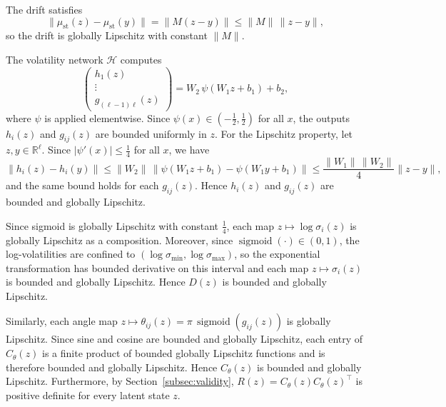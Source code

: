\begin{description}[
    style=unboxed,
    leftmargin=0pt,
    labelindent=0pt,
    labelsep=0.5em
]

\item[Drift.]
The drift satisfies
\[
\|\mu_{\mathrm{st}}(z)-\mu_{\mathrm{st}}(y)\|
=
\|M(z-y)\|
\leq
\|M\|\,\|z-y\|,
\]
so the drift is globally Lipschitz with constant $\|M\|$.

\item[Diffusion.]
The volatility network $\mathcal{H}$ computes
\[
\begin{pmatrix} h_1(z) \\ \vdots \\ g_{(\ell-1)\ell}(z) \end{pmatrix}
=
W_2\,\psi(W_1 z + b_1) + b_2,
\]
where $\psi$ is applied elementwise. Since $\psi(x)\in(-\tfrac{1}{2},\tfrac{1}{2})$
for all $x$, the outputs $h_i(z)$ and $g_{ij}(z)$ are bounded uniformly in $z$.
For the Lipschitz property, let $z,y\in\mathbb{R}^\ell$. Since
$|\psi'(x)|\leq\tfrac{1}{4}$ for all $x$, we have
\[
\|h_i(z)-h_i(y)\|
\leq
\|W_2\|\,\|\psi(W_1 z+b_1)-\psi(W_1 y+b_1)\|
\leq
\frac{\|W_1\|\,\|W_2\|}{4}\|z-y\|,
\]
and the same bound holds for each $g_{ij}(z)$. Hence $h_i(z)$ and $g_{ij}(z)$
are bounded and globally Lipschitz.

Since sigmoid is globally Lipschitz with constant $\tfrac{1}{4}$, each map
$z\mapsto\log\sigma_i(z)$ is globally Lipschitz as a composition. Moreover,
since $\operatorname{sigmoid}(\cdot)\in(0,1)$, the log-volatilities are confined
to $(\log\sigma_{\min},\log\sigma_{\max})$, so the exponential transformation
has bounded derivative on this interval and each map $z\mapsto\sigma_i(z)$ is
bounded and globally Lipschitz. Hence $D(z)$ is bounded and globally Lipschitz.

Similarly, each angle map
$z\mapsto\theta_{ij}(z)=\pi\,\operatorname{sigmoid}(g_{ij}(z))$
is globally Lipschitz. Since sine and cosine are bounded and globally Lipschitz,
each entry of $C_\theta(z)$ is a finite product of bounded globally Lipschitz
functions and is therefore bounded and globally Lipschitz. Hence $C_\theta(z)$
is bounded and globally Lipschitz. Furthermore, by
Section~\ref{subsec:validity}, $R(z)=C_\theta(z)C_\theta(z)^\top$ is positive
definite for every latent state $z$.


\end{description}
